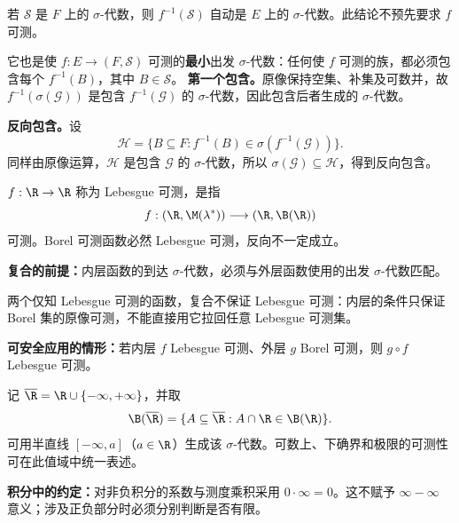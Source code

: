 若 $\mathcal S$ 是 $F$ 上的 $\sigma$-代数，则 $f^{-1}(\mathcal S)$ 自动是 $E$ 上的 $\sigma$-代数。此结论不预先要求 $f$ 可测。

它也是使 $f:E\to(F,\mathcal S)$ 可测的\textbf{最小}出发 $\sigma$-代数：任何使 $f$ 可测的族，都必须包含每个 $f^{-1}(B)$，其中 $B\in\mathcal S$。
\textbf{第一个包含。}原像保持空集、补集及可数并，故 $f^{-1}(\sigma(\mathcal G))$ 是包含 $f^{-1}(\mathcal G)$ 的 $\sigma$-代数，因此包含后者生成的 $\sigma$-代数。

\textbf{反向包含。}设
\[
\mathcal H=\{B\subseteq F:
f^{-1}(B)\in\sigma(f^{-1}(\mathcal G))\}.
\]
同样由原像运算，$\mathcal H$ 是包含 $\mathcal G$ 的 $\sigma$-代数，所以 $\sigma(\mathcal G)\subseteq\mathcal H$，得到反向包含。

$f:\R\to\R$ 称为 Lebesgue 可测，是指
\[
f:(\R,\M(\lambda^*))\longrightarrow(\R,\B(\R))
\]
可测。Borel 可测函数必然 Lebesgue 可测，反向不一定成立。

\textbf{复合的前提：}内层函数的到达 $\sigma$-代数，必须与外层函数使用的出发 $\sigma$-代数匹配。

两个仅知 Lebesgue 可测的函数，复合不保证 Lebesgue 可测：内层的条件只保证 Borel 集的原像可测，不能直接用它拉回任意 Lebesgue 可测集。

\textbf{可安全应用的情形：}若内层 $f$ Lebesgue 可测、外层 $g$ Borel 可测，则 $g\circ f$ Lebesgue 可测。

记 $\overline{\R}=\R\cup\{-\infty,+\infty\}$，并取
\[
\B(\overline{\R})
=\{A\subseteq\overline{\R}:A\cap\R\in\B(\R)\}.
\]
可用半直线 $[-\infty,a]$（$a\in\R$）生成该 $\sigma$-代数。可数上、下确界和极限的可测性可在此值域中统一表述。

\textbf{积分中的约定：}对非负积分的系数与测度乘积采用 $0\cdot\infty=0$。这不赋予 $\infty-\infty$ 意义；涉及正负部分时必须分别判断是否有限。
